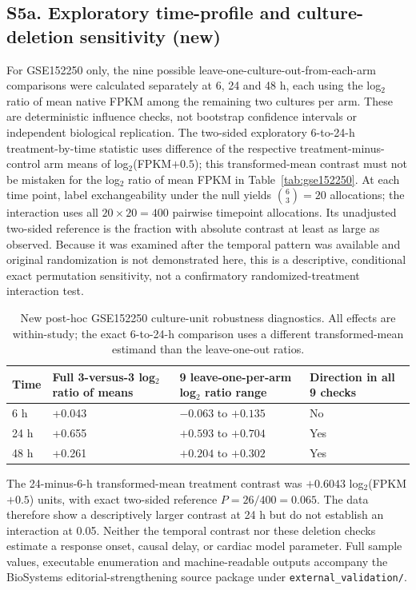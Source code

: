 \documentclass[11pt]{article}
\begin{document}
\subsection*{S5a. Exploratory time-profile and culture-deletion sensitivity (new)}
For GSE152250 only, the nine possible leave-one-culture-out-from-each-arm comparisons were calculated separately at 6, 24 and 48 h, each using the log$_2$ ratio of mean native FPKM among the remaining two cultures per arm. These are deterministic influence checks, not bootstrap confidence intervals or independent biological replication. The two-sided exploratory 6-to-24-h treatment-by-time statistic uses difference of the respective treatment-minus-control arm means of log$_2$(FPKM$+0.5$); this transformed-mean contrast must not be mistaken for the log$_2$ ratio of mean FPKM in Table~\ref{tab:gse152250}. At each time point, label exchangeability under the null yields $\binom{6}{3}=20$ allocations; the interaction uses all $20\times20=400$ pairwise timepoint allocations. Its unadjusted two-sided reference is the fraction with absolute contrast at least as large as observed. Because it was examined after the temporal pattern was available and original randomization is not demonstrated here, this is a descriptive, conditional exact permutation sensitivity, not a confirmatory randomized-treatment interaction test.

\begin{table}[H]\centering
\caption{New post-hoc GSE152250 culture-unit robustness diagnostics. All effects are within-study; the exact 6-to-24-h comparison uses a different transformed-mean estimand than the leave-one-out ratios.}
\label{tab:externalrobust}
\small
\begin{tabularx}{\linewidth}{p{1.35cm}YYp{3.0cm}}
\toprule
\textbf{Time} & \textbf{Full 3-versus-3 log$_2$ ratio of means} & \textbf{9 leave-one-per-arm log$_2$ ratio range} & \textbf{Direction in all 9 checks}\\
 h & +0.043 & $-0.063$ to $+0.135$ & No\\
24 h & +0.655 & $+0.593$ to $+0.704$ & Yes\\
48 h & +0.261 & $+0.204$ to $+0.302$ & Yes\\
\bottomrule
\end{tabularx}
\end{table}

The 24-minus-6-h transformed-mean treatment contrast was $+0.6043$ log$_2$(FPKM$+0.5$) units, with exact two-sided reference $P=26/400=0.065$. The data therefore show a descriptively larger contrast at 24 h but do not establish an interaction at 0.05. Neither the temporal contrast nor these deletion checks estimate a response onset, causal delay, or cardiac model parameter. Full sample values, executable enumeration and machine-readable outputs accompany the BioSystems editorial-strengthening source package under \texttt{external\_validation/}.
\end{document}
